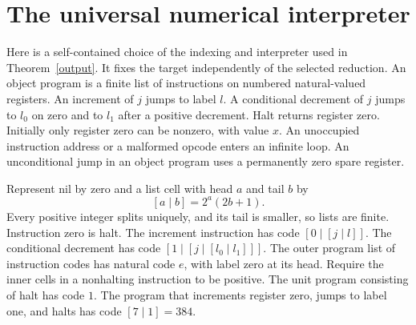 \section{The universal numerical interpreter}\label{app:machine}
Here is a self-contained choice of the indexing and interpreter used in Theorem~\ref{output}. It fixes the target independently of the selected reduction. An object program is a finite list of instructions on numbered natural-valued registers. An increment of \(j\) jumps to label \(l\). A conditional decrement of \(j\) jumps to \(l_0\) on zero and to \(l_1\) after a positive decrement. Halt returns register zero. Initially only register zero can be nonzero, with value \(x\). An unoccupied instruction address or a malformed opcode enters an infinite loop. An unconditional jump in an object program uses a permanently zero spare register.

Represent nil by zero and a list cell with head \(a\) and tail \(b\) by
\[
       [a\mid b]=2^a(2b+1).
\]
Every positive integer splits uniquely, and its tail is smaller, so lists are finite. Instruction zero is halt. The increment instruction has code \([0\mid[j\mid l]]\). The conditional decrement has code \([1\mid[j\mid[l_0\mid l_1]]]\). The outer program list of instruction codes has natural code \(e\), with label zero at its head. Require the inner cells in a nonhalting instruction to be positive. The unit program consisting of halt has code \(1\). The program that increments register zero, jumps to label one, and halts has code \([7\mid 1]=384\).

